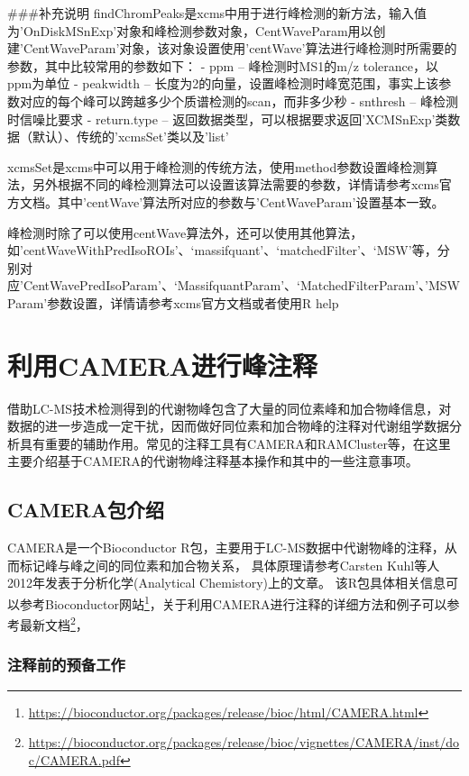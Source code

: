 \documentclass[]{ctexbook}
\renewcommand{\href}[2]{#2\footnote{\url{#1}}}
\begin{document}
\#\#\#补充说明
findChromPeaks是xcms中用于进行峰检测的新方法，输入值为'OnDiskMSnExp'对象和峰检测参数对象，CentWaveParam用以创建'CentWaveParam'对象，该对象设置使用'centWave'算法进行峰检测时所需要的参数，其中比较常用的参数如下：
- ppm -- 峰检测时MS1的m/z tolerance，以ppm为单位
- peakwidth -- 长度为2的向量，设置峰检测时峰宽范围，事实上该参数对应的每个峰可以跨越多少个质谱检测的scan，而非多少秒
- snthresh -- 峰检测时信噪比要求
- return.type -- 返回数据类型，可以根据要求返回'XCMSnExp'类数据（默认）、传统的'xcmsSet'类以及'list'

xcmsSet是xcms中可以用于峰检测的传统方法，使用method参数设置峰检测算法，另外根据不同的峰检测算法可以设置该算法需要的参数，详情请参考xcms官方文档。其中'centWave'算法所对应的参数与'CentWaveParam'设置基本一致。

峰检测时除了可以使用centWave算法外，还可以使用其他算法，如'centWaveWithPredIsoROIs'、`massifquant'、`matchedFilter'、`MSW'等，分别对应'CentWavePredIsoParam'、`MassifquantParam'、`MatchedFilterParam'、'MSWParam'参数设置，详情请参考xcms官方文档或者使用R help

\hypertarget{camera}{%
\section{利用CAMERA进行峰注释}\label{camera}}

借助LC-MS技术检测得到的代谢物峰包含了大量的同位素峰和加合物峰信息，对数据的进一步造成一定干扰，因而做好同位素和加合物峰的注释对代谢组学数据分析具有重要的辅助作用。常见的注释工具有CAMERA和RAMCluster等，在这里主要介绍基于CAMERA的代谢物峰注释基本操作和其中的一些注意事项。

\hypertarget{camera}{%
\subsection{CAMERA包介绍}\label{camera}}

CAMERA是一个Bioconductor R包，主要用于LC-MS数据中代谢物峰的注释，从而标记峰与峰之间的同位素和加合物关系，
具体原理请参考Carsten Kuhl等人2012年发表于分析化学(Analytical Chemistory)上的文章\citep{Kuhl:2011fy}。
该R包具体相关信息可以参考\href{https://bioconductor.org/packages/release/bioc/html/CAMERA.html}{Bioconductor网站}，关于利用CAMERA进行注释的详细方法和例子可以参考\href{https://bioconductor.org/packages/release/bioc/vignettes/CAMERA/inst/doc/CAMERA.pdf}{最新文档}，

\subsubsection{注释前的预备工作}
\end{document}
